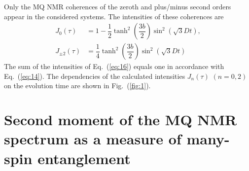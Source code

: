 \documentclass[review]{elsarticle}
\begin{document}
Only the MQ NMR coherences of the zeroth and plus/minus second orders appear in the considered systems. 
The intensities of these coherences are
%
\begin{equation}
    \begin{split}
        \label{eq:16}
        J_0(\tau) & = 1 
        - \dfrac 1 2 \tanh^2\left( \dfrac{3b}{2} \right)
            \sin^2 \left( \sqrt{3} Dt \right), 
        \\
        J_{\pm2}(\tau) & = \dfrac{1}{4} 
            \tanh^2 \left( \dfrac{3b}{2} \right)
            \sin^2 \left( \sqrt{3} Dt \right)
    \end{split}
\end{equation}
%
The sum of the intensities of Eq.~(\ref{eq:16}) equals one in accordance with Eq.~(\ref{eq:14}).
The dependencies of the calculated intensities $J_{n}(\tau)$ $(n=0,2)$ on the evolution time are shown in Fig.~(\ref{fig:1}).



\section{Second moment of the MQ NMR spectrum as a measure of many-spin entanglement}
\label{sec:4}
\end{document}
